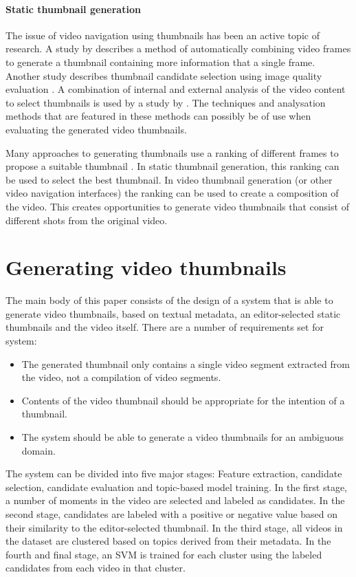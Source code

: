 \documentclass{../resources/sig-alternate-05-2015}
\begin{document}
\paragraph{Static thumbnail generation}
\label{section: static thumbnails}
The issue of video navigation using thumbnails has been an active topic of research. A \citeyear{Kim:2015co} study by \textcite{Kim:2015co} describes a method of automatically combining video frames to generate a thumbnail containing more information that a single frame. Another study describes thumbnail candidate selection using image quality evaluation \cite{Zhang:2014jg}. A combination of internal and external analysis of the video content to select thumbnails is used by a study by \textcite{Liu:2015ux}. The techniques and analysation methods that are featured in these methods can possibly be of use when evaluating the generated video thumbnails.

Many approaches to generating thumbnails use a ranking of different frames to propose a suitable thumbnail \cite{Choi:2015gm,Zhang:2012eo,Gao:2009dx}. In static thumbnail generation, this ranking can be used to select the best thumbnail. In video thumbnail generation (or other video navigation interfaces) the ranking can be used to create a composition of the video. This creates opportunities to generate video thumbnails that consist of different shots from the original video.


\section{Generating video thumbnails}
\label{section: system description}
The main body of this paper consists of the design of a system that is able to generate video thumbnails, based on textual metadata, an editor-selected static thumbnails and the video itself. There are a number of requirements set for system:

\begin{itemize}
	\item The generated thumbnail only contains a single video segment extracted from the video, not a compilation of video segments.
	\item Contents of the video thumbnail should be appropriate for the intention of a thumbnail.
	\item The system should be able to generate a video thumbnails for an ambiguous domain.
\end{itemize}

The system can be divided into five major stages: Feature extraction, candidate selection, candidate evaluation and topic-based model training. In the first stage, a number of moments in the video are selected and labeled as candidates. In the second stage, candidates are labeled with a positive or negative value based on their similarity to the editor-selected thumbnail. In the third stage, all videos in the dataset are clustered based on topics derived from their metadata. In the fourth and final stage, an SVM is trained for each cluster using the labeled candidates from each video in that cluster.
\end{document}
